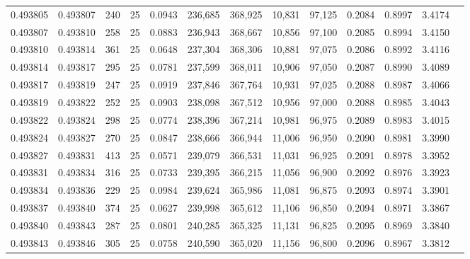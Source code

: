 \begin{tabular}{rrrrrrrrrrrrr}
0.493805 & 0.493807 &   240 &  25 &                                     0.0943 & 236,685 & 368,925 &  10,831 &  97,125 & 0.2084 & 0.8997 & 3.4174 \\
0.493807 & 0.493810 &   258 &  25 &                                     0.0883 & 236,943 & 368,667 &  10,856 &  97,100 & 0.2085 & 0.8994 & 3.4150 \\
0.493810 & 0.493814 &   361 &  25 &                                     0.0648 & 237,304 & 368,306 &  10,881 &  97,075 & 0.2086 & 0.8992 & 3.4116 \\
0.493814 & 0.493817 &   295 &  25 &                                     0.0781 & 237,599 & 368,011 &  10,906 &  97,050 & 0.2087 & 0.8990 & 3.4089 \\
0.493817 & 0.493819 &   247 &  25 &                                     0.0919 & 237,846 & 367,764 &  10,931 &  97,025 & 0.2088 & 0.8987 & 3.4066 \\
0.493819 & 0.493822 &   252 &  25 &                                     0.0903 & 238,098 & 367,512 &  10,956 &  97,000 & 0.2088 & 0.8985 & 3.4043 \\
0.493822 & 0.493824 &   298 &  25 &                                     0.0774 & 238,396 & 367,214 &  10,981 &  96,975 & 0.2089 & 0.8983 & 3.4015 \\
0.493824 & 0.493827 &   270 &  25 &                                     0.0847 & 238,666 & 366,944 &  11,006 &  96,950 & 0.2090 & 0.8981 & 3.3990 \\
0.493827 & 0.493831 &   413 &  25 &                                     0.0571 & 239,079 & 366,531 &  11,031 &  96,925 & 0.2091 & 0.8978 & 3.3952 \\
0.493831 & 0.493834 &   316 &  25 &                                     0.0733 & 239,395 & 366,215 &  11,056 &  96,900 & 0.2092 & 0.8976 & 3.3923 \\
0.493834 & 0.493836 &   229 &  25 &                                     0.0984 & 239,624 & 365,986 &  11,081 &  96,875 & 0.2093 & 0.8974 & 3.3901 \\
0.493837 & 0.493840 &   374 &  25 &                                     0.0627 & 239,998 & 365,612 &  11,106 &  96,850 & 0.2094 & 0.8971 & 3.3867 \\
0.493840 & 0.493843 &   287 &  25 &                                     0.0801 & 240,285 & 365,325 &  11,131 &  96,825 & 0.2095 & 0.8969 & 3.3840 \\
0.493843 & 0.493846 &   305 &  25 &                                     0.0758 & 240,590 & 365,020 &  11,156 &  96,800 & 0.2096 & 0.8967 & 3.3812 \\

\end{tabular}
